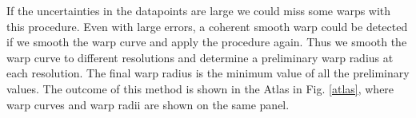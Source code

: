 \documentclass{aa}
\begin{document}
If the uncertainties in the datapoints are large we could miss some
warps with this procedure. Even with large errors, a coherent smooth
warp could be detected if we smooth the warp curve and apply the
procedure again. Thus we smooth the warp curve to different
resolutions and determine a
preliminary warp radius at each resolution. The final warp radius is
the minimum value of all the preliminary values. The outcome of 
this method is shown in the Atlas in Fig. \ref{atlas}, where  warp
curves and warp radii are shown on the same panel. 


\onecolumn
\end{document}
